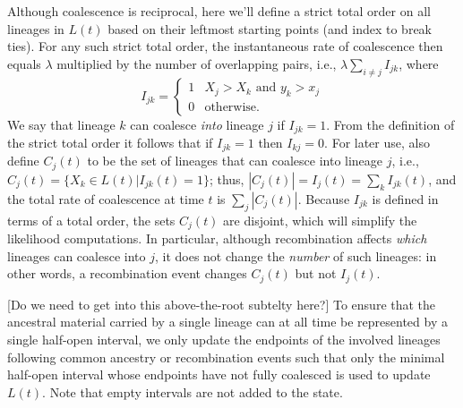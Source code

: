 \documentclass{article}
\begin{document}
Although coalescence is reciprocal, here we'll define a strict total order
on all lineages in $L(t)$ based on their leftmost starting points (and index to break ties).
For any such strict total order,
the instantaneous rate of coalescence then equals $\lambda$ multiplied by the number of overlapping pairs,
i.e., $\lambda \sum_{i \neq j} I_{jk}$,
where
\begin{equation} \label{def:coal}
I_{jk} = \begin{cases}
    1 & X_j > X_k \text{ and } y_k > x_j \\
    0 & \text{otherwise.}
\end{cases}
\end{equation}
We say that lineage $k$ can coalesce \emph{into} lineage $j$ if $I_{jk} = 1$.
From the definition of the strict total order it follows that if $I_{jk} = 1$
then $I_{kj} = 0$. For later use, also define $C_j(t)$ to be the set of
lineages that can coalesce into lineage $j$, i.e., 
$C_j(t) = \{X_k \in L(t) | I_{jk}(t) = 1\}$; 
thus, $|C_j(t)| = I_{j}(t) = \sum_{k} I_{jk}(t)$,
and the total rate of coalescence at time $t$ is $\sum_{j} |C_j(t)|$. 
Because $I_{jk}$ is defined in terms of a total order, the sets $C_j(t)$ are disjoint,
which will simplify the likelihood computations. In particular, although
recombination affects \emph{which} lineages can coalesce into $j$, it does not
change the \emph{number} of such lineages: in other words, a recombination
event changes $C_j(t)$ but not $I_{j}(t)$.


[Do we need to get into this above-the-root subtelty here?]
To ensure that the ancestral material carried by a single lineage can at
all time be represented by a single half-open interval, we only update the
endpoints of the involved lineages following common ancestry or recombination events
such that only the minimal half-open interval whose endpoints have not fully coalesced
is used to update $L(t)$. Note that empty intervals are not added to the state.
\end{document}
